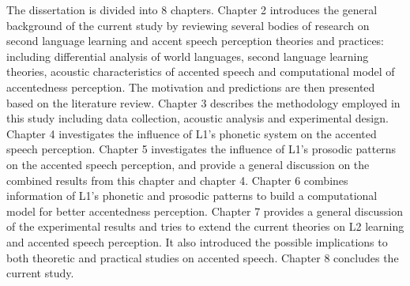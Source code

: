 The dissertation is divided into 8 chapters. Chapter 2 introduces the general background of the current study by reviewing several bodies of research on second language learning and accent speech perception theories and practices: including differential analysis of world languages, second language learning theories, acoustic characteristics of accented speech and computational model of accentedness perception. The motivation and predictions are then presented based on the literature review. Chapter 3 describes the methodology employed in this study including data collection, acoustic analysis and experimental design. Chapter 4 investigates the influence of L1's phonetic system on the accented speech perception. Chapter 5 investigates the influence of L1's prosodic patterns on the accented speech perception, and provide a general discussion on the combined results from this chapter and chapter 4. Chapter 6 combines information of L1's phonetic and prosodic patterns to build a computational model for better accentedness perception. Chapter 7 provides a general discussion of the experimental results and tries to extend the current theories on L2 learning and accented speech perception. It also introduced the possible implications to both theoretic and practical studies on accented speech. Chapter 8 concludes the current study.



